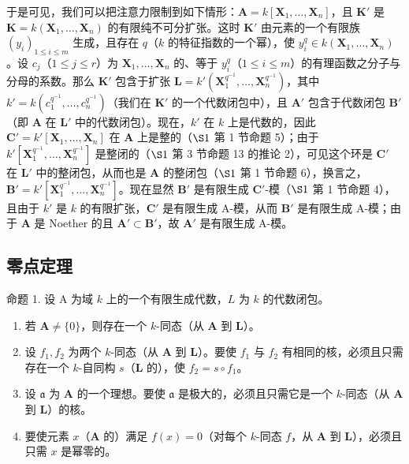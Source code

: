于是可见，我们可以把注意力限制到如下情形：\(\mathbf{A} = k[\mathbf{X}_1, \ldots, \mathbf{X}_n]\)，且 \(\mathbf{K}'\) 是 \(\mathbf{K} = k(\mathbf{X}_1, \ldots, \mathbf{X}_n)\) 的有限纯不可分扩张。这时 \(\mathbf{K}'\) 由元素的一个有限族 \((y_i)_{1 \leqslant i \leqslant m}\) 生成，且存在 \(q\)（\(k\) 的特征指数的一个幂），使 \(y_i^q \in k(\mathbf{X}_1, \ldots, \mathbf{X}_n)\)。设 \(c_j\)（\(1 \leqslant j \leqslant r\)）为 \(\mathbf{X}_1, \ldots, \mathbf{X}_n\) 的、等于 \(y_i^q\)（\(1 \leqslant i \leqslant m\)）的有理函数之分子与分母的系数。那么 \(\mathbf{K}'\) 包含于扩张 \(\mathbf{L} = k'(\mathbf{X}_1^{q^{-1}}, \ldots, \mathbf{X}_n^{q^{-1}})\)，其中 \(k' = k(c_1^{q^{-1}}, \ldots, c_n^{q^{-1}})\)（我们在 \(\mathbf{K}'\) 的一个代数闭包中），且 \(\mathbf{A}'\) 包含于代数闭包 \(\mathbf{B}'\)（即 \(\mathbf{A}\) 在 \(\mathbf{L}'\) 中的代数闭包）。现在，\(k'\) 在 \(k\) 上是代数的，因此 \(\mathbf{C}' = k'[\mathbf{X}_1, \ldots, \mathbf{X}_n]\) 在 \(\mathbf{A}\) 上是整的（\(\S 1\) 第 1 节命题 5）；由于 \(k'[\mathbf{X}_1^{q^{-1}}, \ldots, \mathbf{X}_n^{q^{-1}}]\) 是整闭的（\(\S 1\) 第 3 节命题 13 的推论 2），可见这个环是 \(\mathbf{C}'\) 在 \(\mathbf{L}'\) 中的整闭包，从而也是 \(\mathbf{A}\) 的整闭包（\(\S 1\) 第 1 节命题 6），换言之，\(\mathbf{B}' = k'[\mathbf{X}_1^{q^{-1}}, \ldots, \mathbf{X}_n^{q^{-1}}]\)。现在显然 \(\mathbf{B}'\) 是有限生成 \(\mathbf{C}'\)-模（\(\S 1\) 第 1 节命题 4），且由于 \(k'\) 是 \(k\) 的有限扩张，\(\mathbf{C}'\) 是有限生成 A-模，从而 \(\mathbf{B}'\) 是有限生成 A-模；由于 \(\mathbf{A}\) 是 Noether 的且 \(\mathbf{A}' \subset \mathbf{B}'\)，故 \(\mathbf{A}'\) 是有限生成 A-模。

\subsection{零点定理}

命题 1. 设 A 为域 \(k\) 上的一个有限生成代数，\(L\) 为 \(k\) 的代数闭包。

\begin{enumerate}
\def\labelenumi{(\roman{enumi})}
\item
  若 \(\mathbf{A} \neq \{0\}\)，则存在一个 \(k\)-同态（从 \(\mathbf{A}\) 到 \(\mathbf{L}\)）。
\item
  设 \(f_{1}, f_{2}\) 为两个 \(k\)-同态（从 \(\mathbf{A}\) 到 \(\mathbf{L}\)）。要使 \(f_{1}\) 与 \(f_{2}\) 有相同的核，必须且只需存在一个 \(k\)-自同构 \(s\)（\(\mathbf{L}\) 的），使 \(f_{2} = s \circ f_{1}\)。
\item
  设 \(\mathfrak{a}\) 为 \(\mathbf{A}\) 的一个理想。要使 \(\mathfrak{a}\) 是极大的，必须且只需它是一个 \(k\)-同态（从 \(\mathbf{A}\) 到 \(\mathbf{L}\)）的核。
\item
  要使元素 \(x\)（\(\mathbf{A}\) 的）满足 \(f(x) = 0\)（对每个 \(k\)-同态 \(f\)，从 \(\mathbf{A}\) 到 \(\mathbf{L}\)），必须且只需 \(x\) 是幂零的。
\end{enumerate}

